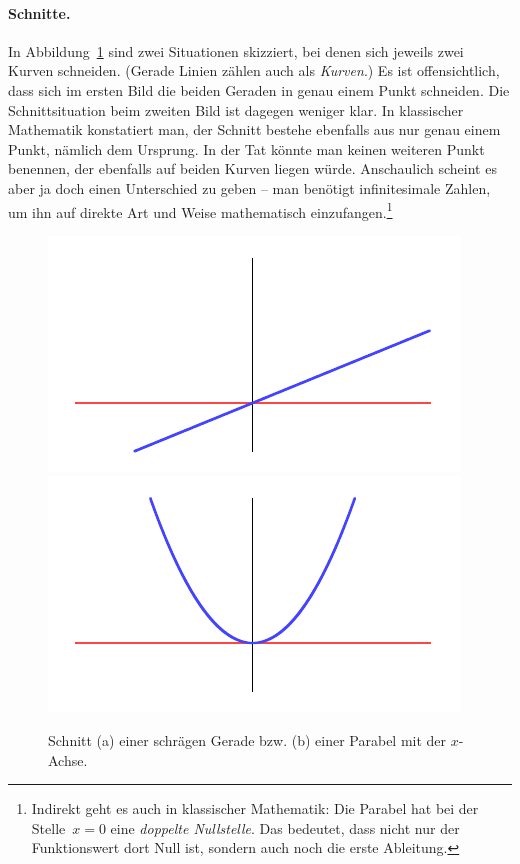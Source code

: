 \documentclass[twoside]{../zirkelblatt}
\theoremstyle{definition}
\theoremstyle{plain}
\theoremstyle{remark}
\begin{document}
\paragraph{Schnitte.} In Abbildung~\ref{fig:schnittverhalten} sind zwei Situationen skizziert, bei
denen sich jeweils zwei Kurven schneiden. (Gerade Linien zählen
auch als \emph{Kurven}.) Es ist offensichtlich, dass sich im ersten
Bild die beiden Geraden in genau einem Punkt schneiden. Die Schnittsituation
beim zweiten Bild ist dagegen weniger klar. In klassischer Mathematik konstatiert man,
der Schnitt bestehe ebenfalls aus nur genau einem Punkt, nämlich dem Ursprung.
In der Tat könnte man keinen weiteren Punkt benennen, der ebenfalls auf beiden
Kurven liegen würde. Anschaulich scheint es aber ja doch einen Unterschied zu
geben -- man benötigt infinitesimale Zahlen, um ihn auf direkte Art und Weise
mathematisch einzufangen.\footnote{Indirekt geht es auch in klassischer
Mathematik: Die Parabel hat bei der Stelle~$x = 0$ eine \emph{doppelte
Nullstelle}. Das bedeutet, dass nicht nur der Funktionswert dort Null ist,
sondern auch noch die erste Ableitung.}
\begin{figure}[b]
  \centering
  \includegraphics{sdg-schnittverhalten1}
  \includegraphics{sdg-schnittverhalten2}
  \caption{\label{fig:schnittverhalten}Schnitt (a) einer schrägen Gerade
  bzw. (b) einer Parabel mit der $x$-Achse.}
\end{figure}
\end{document}
